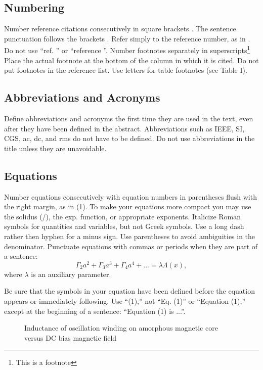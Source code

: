 \documentclass[letterpaper, 10 pt, conference]{ieeeconf}  %
\begin{document}
\subsection{Numbering}

Number reference citations consecutively in square brackets \cite{Garcia.ea:Auto89}.
 The sentence punctuation follows the brackets \cite{Garcia.ea:Auto89}.
 Refer simply to the reference number, as in \cite{Garcia.ea:Auto89}.
 Do not use ``ref. \cite{Garcia.ea:Auto89}'' or ``reference \cite{Garcia.ea:Auto89}''.
Number footnotes separately in superscripts\footnote{This is a footnote}
Place the actual footnote at the bottom of the column in which it is cited.
Do not put footnotes in the reference list.
Use letters for table footnotes (see Table I).

\subsection{Abbreviations and Acronyms}

Define abbreviations and acronyms the first time they are used in the text,
even after they have been defined in the abstract. Abbreviations such as
IEEE, SI, CGS, ac, dc, and rms do not have to be defined. Do not use
abbreviations in the title unless they are unavoidable.

\subsection{Equations}

Number equations consecutively with equation numbers in parentheses flush
 with the right margin, as in (1). To make your equations more compact
 you may use the solidus (/), the exp. function, or appropriate exponents.
  Italicize Roman symbols for quantities and variables, but not Greek symbols.
   Use a long dash rather then hyphen for a minus sign. Use parentheses to avoid
    ambiguities in the denominator.
Punctuate equations with commas or periods when they are part of a sentence:
$$\Gamma_2 a^2 + \Gamma_3 a^3 + \Gamma_4 a^4 + ... = \lambda \Lambda(x),$$
where $\lambda$ is an auxiliary parameter.

Be sure that the symbols in your equation have been defined before the
equation appears or immediately following.
Use ``(1),'' not ``Eq. (1)'' or ``Equation (1),''
except at the beginning of a sentence: ``Equation (1) is ...''.


   \begin{figure}[thpb]
      \centering
      \caption{Inductance of oscillation winding on amorphous
       magnetic core versus DC bias magnetic field}
      \label{figurelabel}
   \end{figure}
\end{document}

